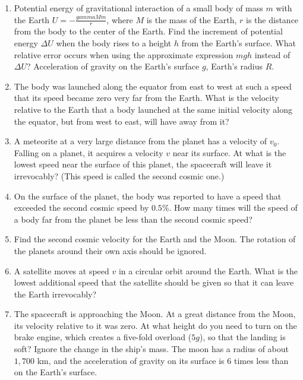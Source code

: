 \documentclass{article}
\begin{document}
\begin{enumerate}[label=2.6.\arabic*]
\item Potential energy of gravitational interaction of a small body of mass $m$ with the Earth $U = - \frac{gamma M m}{r}$, where $M$ is the mass of the Earth, $r$ is the distance from the body to the center of the Earth. Find the increment of potential energy $\Delta U$ when the body rises to a height $h$ from the Earth's surface. What relative error occurs when using the approximate expression $mgh$ instead of $\Delta U$? Acceleration of gravity on the Earth's surface $g$, Earth's radius $R$.

\item The body was launched along the equator from east to west at such a speed that its speed became zero very far from the Earth. What is the velocity relative to the Earth that a body launched at the same initial velocity along the equator, but from west to east, will have away from it?

\item A meteorite at a very large distance from the planet has a velocity of $v_0$. Falling on a planet, it acquires a velocity $v$ near its surface. At what is the lowest speed near the surface of this planet, the spacecraft will leave it irrevocably? (This speed is called the second cosmic one.)

\item On the surface of the planet, the body was reported to have a speed that exceeded the second cosmic speed by $0.5\%$. How many times will the speed of a body far from the planet be less than the second cosmic speed?

\item Find the second cosmic velocity for the Earth and the Moon. The rotation of the planets around their own axis should be ignored.

\item A satellite moves at speed $v$ in a circular orbit around the Earth. What is the lowest additional speed that the satellite should be given so that it can leave the Earth irrevocably?

\item The spacecraft is approaching the Moon. At a great distance from the Moon, its velocity relative to it was zero. At what height do you need to turn on the brake engine, which creates a five-fold overload ($5g$), so that the landing is soft? Ignore the change in the ship's mass. The moon has a radius of about $1,700$ km, and the acceleration of gravity on its surface is $6$ times less than on the Earth's surface.


\end{enumerate}
\end{document}
